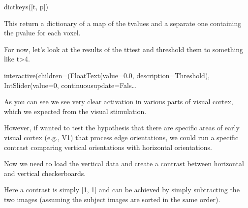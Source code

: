 \documentclass[letterpaper,10pt,english]{sphinxmanual}
\begin{document}
\begin{sphinxVerbatim}[commandchars=\\\{\}]
  

\end{sphinxVerbatim}

\begin{sphinxVerbatim}[commandchars=\\\{\}]
dict\PYGZus{}keys([\PYGZsq{}t\PYGZsq{}, \PYGZsq{}p\PYGZsq{}])
\end{sphinxVerbatim}

This return a dictionary of a map of the t\sphinxhyphen{}values and a separate one containing the p\sphinxhyphen{}value for each voxel.

For now, let’s look at the results of the t\sphinxhyphen{}ttest and threshold them to something like t\textgreater{}4.

\begin{sphinxVerbatim}[commandchars=\\\{\}]
\PYG{p}{[}\PYG{p}{]}
\end{sphinxVerbatim}

\begin{sphinxVerbatim}[commandchars=\\\{\}]
interactive(children=(FloatText(value=0.0, description=\PYGZsq{}Threshold\PYGZsq{}), IntSlider(value=0, continuous\PYGZus{}update=Fals…
\end{sphinxVerbatim}

As you can see we see very clear activation in various parts of visual cortex, which we expected from the visual stimulation.

However, if wanted to test the hypothesis that there are specific areas of early visual cortex (e.g., V1) that process edge orientations, we could run a specific contrast comparing vertical orientations with horizontal orientations.

Now we need to load the vertical data and create a contrast between horizontal and vertical checkerboards.

Here a contrast is simply {[}1, \sphinxhyphen{}1{]} and can be achieved by simply subtracting the two images (assuming the subject images are sorted in the same order).
\end{document}
